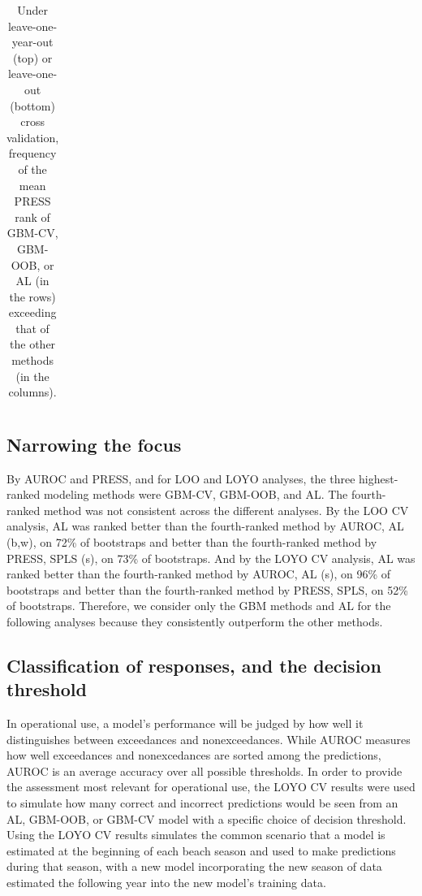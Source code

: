 \documentclass[authoryear,review, 12pt]{elsarticle}
\begin{document}
\begin{table}
\begin{tabular}{rccccccc}
    \end{tabular}
    \caption{Under leave-one-year-out (top) or leave-one-out (bottom) cross validation, frequency of the mean PRESS rank of GBM-CV, GBM-OOB, or AL (in the rows) exceeding that of the other methods (in the columns).}
    \label{table:press.pairs.annual}
\end{table}

\subsection{Narrowing the focus}\label{narrowing-the-focus}

By AUROC and PRESS, and for LOO and LOYO analyses, the three
highest-ranked modeling methods were GBM-CV, GBM-OOB, and AL. The
fourth-ranked method was not consistent across the different analyses.
By the LOO CV analysis, AL was ranked better than the fourth-ranked
method by AUROC, AL (b,w), on 72\% of bootstraps and better than the
fourth-ranked method by PRESS, SPLS (s), on 73\% of bootstraps. And by
the LOYO CV analysis, AL was ranked better than the fourth-ranked method
by AUROC, AL (s), on 96\% of bootstraps and better than the
fourth-ranked method by PRESS, SPLS, on 52\% of bootstraps. Therefore,
we consider only the GBM methods and AL for the following analyses
because they consistently outperform the other methods.

\subsection{Classification of responses, and the decision
threshold}\label{threshold}

In operational use, a model's performance will be judged by how well it
distinguishes between exceedances and nonexceedances. While AUROC
measures how well exceedances and nonexcedances are sorted among the
predictions, AUROC is an average accuracy over all possible thresholds.
In order to provide the assessment most relevant for operational use,
the LOYO CV results were used to simulate how many correct and incorrect
predictions would be seen from an AL, GBM-OOB, or GBM-CV model with a
specific choice of decision threshold. Using the LOYO CV results
simulates the common scenario that a model is estimated at the beginning
of each beach season and used to make predictions during that season,
with a new model incorporating the new season of data estimated the
following year into the new model's training data.
\end{document}
